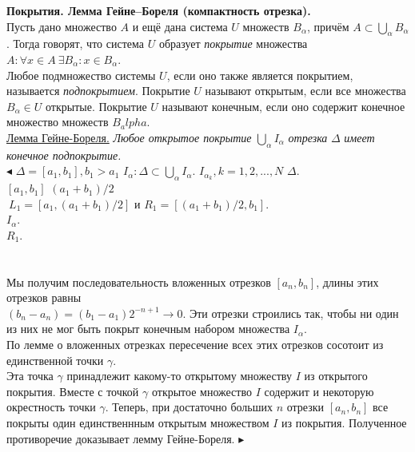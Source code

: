 \textbf{Покрытия. Лемма Гейне–Бореля (компактность отрезка).}\\
Пусть дано множество $A$ и ещё дана система $U$ множеств $B_\alpha$, причём $A \subset \bigcup _\alpha B_\alpha$. Тогда говорят, что система $U$ образует \textit{покрытие} множества $A: \forall x \in A \: \exists B_\alpha : x \in B_\alpha$.\\
Любое подмножество системы $U$, если оно также является покрытием, называется \textit{подпокрытием}. Покрытие $U$ называют открытым, если все множества $B_\alpha \in U$ открытые. Покрытие $U$ называют конечным, если оно содержит конечное множество множеств $B_alpha$.\\
\underline{Лемма Гейне-Бореля.} \textit{Любое открытое покрытие} $\bigcup _\alpha I_\alpha$ \textit{отрезка} $\Delta $ \textit{ имеет конечное подпокрытие.}\\
$\blacktriangleleft$
 $\Delta = [a_1, b_1], b_1 > a_1$  $I_\alpha : \Delta \subset \bigcup _\alpha I_\alpha$.
 $I_{\alpha_k}, k = 1,2,...,N$ 
 $\Delta$.\\  $[a_1, b_1]$  $(a_1 + b_1)/2$  \\ $\: L_1 = [a_1, (a_1 + b_1)/2]$ и $R_1 = [(a_1 + b_1)/2, b_1].$ \\ 
 $I_\alpha$.\\
 $R_1$. \\ 
\\ \\
Мы получим последовательность вложенных отрезков $[a_n, b_n]$, длины этих отрезков равны \\ $(b_n - a_n) = (b_1 - a_1)2^{-n+1}\rightarrow 0$. Эти отрезки строились так, чтобы ни один из них не мог быть покрыт конечным набором множества $I_\alpha$.\\
По лемме о вложенных отрезках пересечение всех этих отрезков сосотоит из единственной точки $\gamma$.\\
Эта точка $\gamma$ принадлежит какому-то открытому множеству $I$ из открытого покрытия. Вместе с точкой $\gamma$ открытое множество $I$ содержит и некоторую окрестность точки $\gamma$. Теперь, при достаточно больших $n$ отрезки $[a_n, b_n]$ все покрыты один единственнным открытым множеством $I$ из покрытия. Полученное противоречие доказывает лемму Гейне-Бореля. $\blacktriangleright$
\\ 
\\
\\




